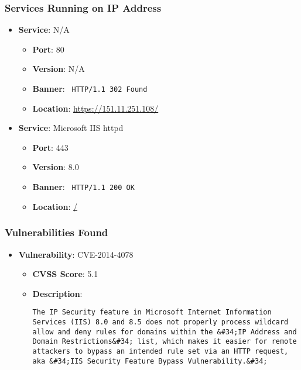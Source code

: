 \documentclass{article}
\begin{document}
\subsubsection*{Services Running on IP Address}

\begin{itemize}
    
        \item \textbf{Service}: N/A
        \begin{itemize}
            \item \textbf{Port}: 80
            \item \textbf{Version}:  N/A 
            \item \textbf{Banner}: \texttt{
                HTTP/1.1 302 Found
            }
            \item \textbf{Location}: \href{ https://151.11.251.108/ }{ https://151.11.251.108/ }
        \end{itemize}
    
        \item \textbf{Service}: Microsoft IIS httpd
        \begin{itemize}
            \item \textbf{Port}: 443
            \item \textbf{Version}:  8.0 
            \item \textbf{Banner}: \texttt{
                HTTP/1.1 200 OK
            }
            \item \textbf{Location}: \href{ / }{ / }
        \end{itemize}
    
\end{itemize}


\subsubsection*{Vulnerabilities Found}

\begin{itemize}
    
        \item \textbf{Vulnerability}: CVE-2014-4078
        \begin{itemize}
            \item \textbf{CVSS Score}:  5.1 
            \item \textbf{Description}:
            \parbox[t]{0.9\linewidth}{
                \verb|The IP Security feature in Microsoft Internet Information Services (IIS) 8.0 and 8.5 does not properly process wildcard allow and deny rules for domains within the &#34;IP Address and Domain Restrictions&#34; list, which makes it easier for remote attackers to bypass an intended rule set via an HTTP request, aka &#34;IIS Security Feature Bypass Vulnerability.&#34;|
            }
        \end{itemize}
    
\end{itemize}
\end{document}
